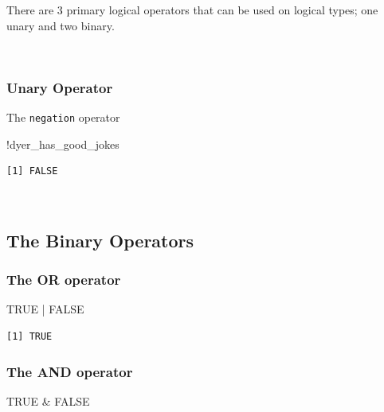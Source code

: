\documentclass[
  letterpaper,
]{book}
\newenvironment{Shaded}{\begin{snugshade}}{\end{snugshade}}
\newcommand{\ConstantTok}[1]{\textcolor[rgb]{0.56,0.35,0.01}{#1}}
\newcommand{\NormalTok}[1]{\textcolor[rgb]{0.00,0.23,0.31}{#1}}
\newcommand{\SpecialCharTok}[1]{\textcolor[rgb]{0.37,0.37,0.37}{#1}}
\begin{document}
There are 3 primary logical operators that can be used on logical types;
one unary and two binary.

~

\subsubsection{Unary Operator}\label{unary-operator}

The \texttt{negation} operator

\begin{Shaded}
\begin{Highlighting}[]
\SpecialCharTok{!}\NormalTok{dyer\_has\_good\_jokes}
\end{Highlighting}
\end{Shaded}

\begin{verbatim}
[1] FALSE
\end{verbatim}

~

\subsection{The Binary Operators}\label{the-binary-operators}

\subsubsection{The OR operator}\label{the-or-operator}

\begin{Shaded}
\begin{Highlighting}[]
\ConstantTok{TRUE} \SpecialCharTok{|} \ConstantTok{FALSE}
\end{Highlighting}
\end{Shaded}

\begin{verbatim}
[1] TRUE
\end{verbatim}

\subsubsection{The AND operator}\label{the-and-operator}

\begin{Shaded}
\begin{Highlighting}[]
\ConstantTok{TRUE} \SpecialCharTok{\&} \ConstantTok{FALSE}
\end{Highlighting}
\end{Shaded}
\end{document}

